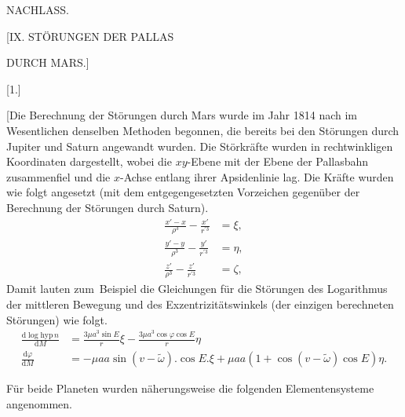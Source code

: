 \clearpage
\begingroup
{}
\renewcommand{\headrulewidth}{0pt}
\clearpage
{}
\begin{center}
\large NACHLASS.
\par\bigskip
\Large [IX. STÖRUNGEN DER PALLAS\par DURCH MARS.]
\par\bigskip
\normalsize [1.]
\end{center}
\begingroup
\small
\makeatletter\tagsleft@true\let\veqno\@@leqno\makeatother
\par\noindent\hspace*{\parindent}[Die Berechnung der Störungen durch Mars wurde im Jahr 1814 nach im Wesentlichen denselben Methoden
begonnen, die bereits bei den Störungen durch Jupiter und Saturn angewandt wurden. Die Störkräfte
wurden in rechtwinkligen Koordinaten dargestellt, wobei die \(xy\)-Ebene mit der Ebene der Pallasbahn zusammenfiel und die
\(x\)-Achse entlang ihrer Apsidenlinie lag. Die Kräfte wurden wie folgt angesetzt (mit dem entgegengesetzten Vorzeichen
gegenüber der Berechnung der Störungen durch Saturn).
\[
\tag*{1)}
\begin{aligned}
\frac{x'-x}{\rho^3}-\frac{x'}{r^{\prime3}}&=\xi,\\[.6em]
\frac{y'-y}{\rho^3}-\frac{y'}{r^{\prime3}}&=\eta,\\[.6em]
\frac{z'}{\rho^3}-\frac{z'}{r^{\prime3}}&=\zeta,
\end{aligned}
\]
Damit lauten zum\ Beispiel die Gleichungen für die Störungen des Logarithmus der mittleren Bewegung und des Exzentrizitätswinkels
(der einzigen berechneten Störungen) wie folgt.
\[
\tag*{2)}
\begin{aligned}
\frac{\mathrm{d}\log\mathrm{hyp}\,n}{\mathrm{d}M}
&=\frac{3\mu a^3\sin E}{r}\xi-\frac{3\mu a^3\cos\varphi\cos E}{r}\eta\\[.6em]
\frac{\mathrm{d}\varphi}{\mathrm{d}M}
&=-\mu aa\sin(v-\tilde\omega)\mathord{.}\cos E\mathord{.}\xi
  +\mu aa(1+\cos(v-\tilde\omega)\cos E)\eta.
\end{aligned}
\]
\par\noindent\hspace*{\parindent}Für beide Planeten wurden näherungsweise die folgenden Elementensysteme angenommen.
